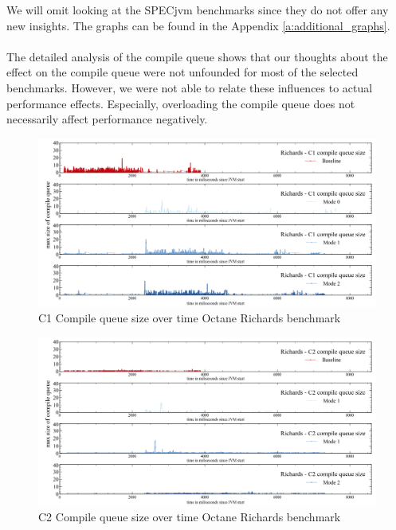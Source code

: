 We will omit looking at the SPECjvm benchmarks since they do not offer any new insights. The graphs can be found in the Appendix \ref{a:additional_graphs}.
\\\\
The detailed analysis of the compile queue shows that our thoughts about the effect on the compile queue were not unfounded for most of the selected benchmarks. However, we were not able to relate these influences to actual performance effects. Especially, overloading the compile queue does not necessarily affect performance negatively.
\begin{figure}[ht]
  \begin{center}
    \centering
    \includegraphics[width=1.0\textwidth]{figures/octane_queue_richards_separate_c1.png}
    \caption{C1 Compile queue size over time Octane Richards benchmark}
    \label{f:octane_queue_richards_separate_c1}
  \end{center}
\end{figure}
\begin{figure}[ht]
  \begin{center}
    \centering
    \includegraphics[width=1.0\textwidth]{figures/octane_queue_richards_separate_c2.png}
    \caption{C2 Compile queue size over time Octane Richards benchmark}
    \label{f:octane_queue_richards_separate_c2}
  \end{center}
\end{figure}
